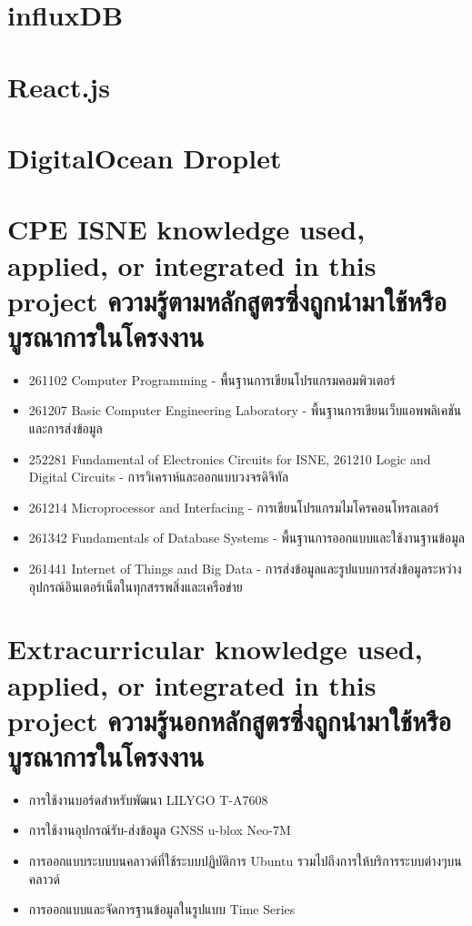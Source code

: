 \section{influxDB}

\section{React.js}

\section{DigitalOcean Droplet}

\section{\ifenglish%
\ifcpe CPE \else ISNE \fi knowledge used, applied, or integrated in this project
\else%
ความรู้ตามหลักสูตรซึ่งถูกนำมาใช้หรือบูรณาการในโครงงาน
\fi
}
\begin{itemize}
  \item 261102 Computer Programming - พื้นฐานการเขียนโปรแกรมคอมพิวเตอร์
  \item 261207 Basic Computer Engineering Laboratory - พื้นฐานการเขียนเว็บแอพพลิเคชันและการส่งข้อมูล
  \item 252281 Fundamental of Electronics Circuits for ISNE, 261210 Logic and Digital Circuits - การวิเคราห์และออกแบบวงจรดิจิทัล
  \item 261214 Microprocessor and Interfacing - การเขียนโปรแกรมไมโครคอนโทรลเลอร์
  \item 261342 Fundamentals of Database Systems - พื้นฐานการออกแบบและใช้งานฐานข้อมูล
  \item 261441 Internet of Things and Big Data - การส่งข้อมูลและรูปแบบการส่งข้อมูลระหว่างอุปกรณ์อินเตอร์เน็ตในทุกสรรพสิ่งและเครือข่าย
\end{itemize}

\section{\ifenglish%
Extracurricular knowledge used, applied, or integrated in this project
\else%
ความรู้นอกหลักสูตรซึ่งถูกนำมาใช้หรือบูรณาการในโครงงาน
\fi
}
\begin{itemize}
  \item การใช้งานบอร์ดสำหรับพัฒนา LILYGO T-A7608
  \item การใช้งานอุปกรณ์รับ-ส่งข้อมูล GNSS u-blox Neo-7M
  \item การออกแบบระบบบนคลาวด์ที่ใช้ระบบปฏิบัติการ Ubuntu รวมไปถึงการให้บริการระบบต่างๆบนคลาวด์
  \item การออกแบบและจัดการฐานข้อมูลในรูปแบบ Time Series
\end{itemize}